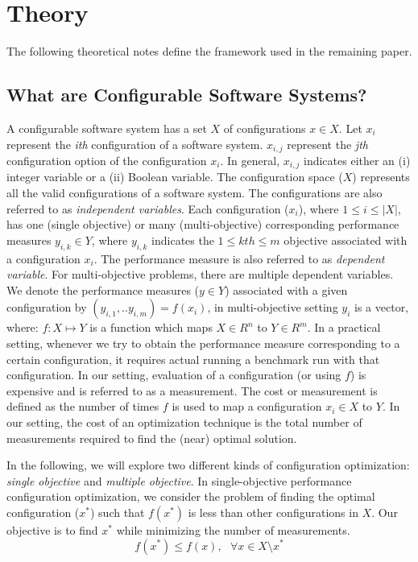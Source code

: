 \section{Theory}
The following theoretical notes define the framework used in the remaining paper.

\subsection{What are Configurable Software Systems?}\label{sec:problem_formal}

 
A configurable software system has a set $X$ of configurations $x \in X$. 
Let $x_i$ represent the \textit{ith} configuration of a software system. $x_{i,j}$ represent the \textit{jth} configuration option of the configuration $x_i$. In general, $x_{i,j}$ indicates either an (i) integer variable or a (ii) Boolean variable. The configuration space ($X$) represents all the valid configurations of a software system. The configurations are also referred to as \textit{independent variables}.
Each configuration ($x_i$), where $1\le i\le |X|$, has one (single objective) or many (multi-objective) corresponding performance measures $y_{i,k} \in Y$, where $y_{i,k}$  indicates the $1\le kth\le m$ objective  associated with a configuration $x_i$. The performance measure is also referred to as \textit{dependent variable}. For multi-objective problems, there are multiple dependent variables. 
We denote the performance measures ($y\in Y$) associated with a given configuration by $(y_{i,1},..y_{i,m})=f(x_i)$, in multi-objective setting $y_i$ is a vector, where: $f: X\mapsto Y $ is a function which maps $X \in R^n$ to $Y \in R^m$. In a practical setting, whenever we try to obtain the performance measure corresponding to a certain configuration, it requires actual running a benchmark run with that configuration. In our setting, evaluation of a configuration (or using $f$) is expensive and is referred to as a measurement. The cost or measurement is defined as the number of times $f$ is used to map a configuration $x_i \in X$ to $Y$. In our setting, the cost of an optimization technique is the total number of measurements required to find the (near) optimal solution.

In the following, we will explore two different kinds of configuration optimization: {\em single objective}
and {\em multiple objective}.
In single-objective performance configuration optimization,
we consider the problem of finding the optimal configuration ($x^*$) such that $f(x^*)$ is less than other configurations in $X$. Our objective is to find $x^*$ while minimizing the number of measurements.
\begin{equation}
    f(x^*) \le f(x),~~~ \forall x \in {X\setminus x^*}
\end{equation}
 

